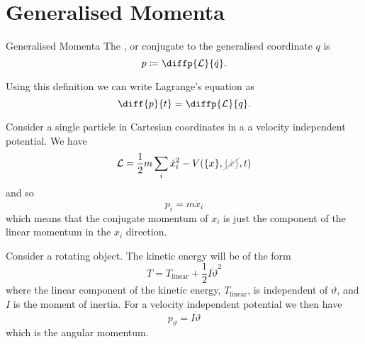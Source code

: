 \documentclass[fleqn]{NotesClass}
\newcommand*{\nodependence}[1]{\textcolor{gray}{\cancel{#1}}}
\newcommand*{\lagrangian}{\mathcal{L}}
\begin{document}
    \section{Generalised Momenta}
    \begin{dfn}{Generalised Momenta}{}
        The , or  conjugate to the generalised coordinate \(q\) is
        \begin{equation}
            p \coloneqq \diffp{\lagrangian}{\dot{q}}.
        \end{equation}
    \end{dfn}
    
    Using this definition we can write Lagrange's equation as
    \begin{equation}
        \diff{p}{t} = \diffp{\lagrangian}{q}.
    \end{equation}
    
    \begin{exm}{}{}
        Consider a single particle in Cartesian coordinates in a a velocity independent potential.
        We have
        \begin{equation}
            \lagrangian = \frac{1}{2}m\sum_i \dot{x}_i^2 - V(\{x\}, \nodependence{\{\dot{x}\}}, t)
        \end{equation}
        and so
        \begin{equation}
            p_i = m\dot{x}_i
        \end{equation}
        which means that the conjugate momentum of \(x_i\) is just the component of the linear momentum in the \(x_i\) direction.
    \end{exm}
    
    \begin{exm}{}{}
        Consider a rotating object.
        The kinetic energy will be of the form
        \begin{equation}
            T = T_{\mathrm{linear}} + \frac{1}{2}I\dot{\vartheta}^2
        \end{equation}
        where the linear component of the kinetic energy, \(T_{\mathrm{linear}}\), is independent of \(\dot{\vartheta}\), and \(I\) is the moment of inertia.
        For a velocity independent potential we then have
        \begin{equation}
            p_{\vartheta} = I\dot{\vartheta}
        \end{equation}
        which is the angular momentum.
    \end{exm}
    
\end{document}
